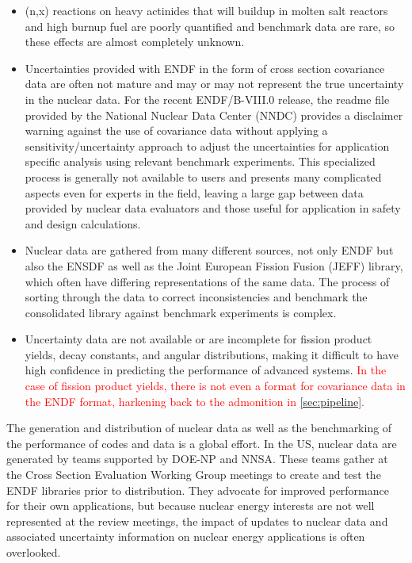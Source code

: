 \documentclass[letterpaper]{ar-1col}
\newcommand{\textred}[1]{\textcolor{red}{ #1}}
\begin{document}
\begin{itemize}
  \item (n,x) reactions on heavy actinides that will buildup in molten salt reactors and high burnup fuel are poorly quantified and benchmark data are rare, so these effects are almost completely unknown.
  \item Uncertainties provided with ENDF in the form of cross section covariance data are often not mature and may or may not represent the true uncertainty in the nuclear data.
For the recent ENDF/B-VIII.0 release, the readme file provided by the National Nuclear Data Center (NNDC) provides a disclaimer warning against the use of covariance data without applying a sensitivity/uncertainty approach to adjust the uncertainties for application specific analysis using relevant benchmark experiments.
This specialized process is generally not available to users and presents many complicated aspects even for experts in the field, leaving a large gap between data provided by nuclear data evaluators and those useful for application in safety and design calculations.
  \item Nuclear data are gathered from many different sources, not only ENDF but also the ENSDF as well as the Joint European Fission Fusion (JEFF) library, which often have differing representations of the same data.
The process of sorting through the data to correct inconsistencies and benchmark the consolidated library against benchmark experiments is complex.
  \item Uncertainty data are not available or are incomplete for fission product yields, decay constants, and angular distributions, making it difficult to have high confidence in predicting the performance of advanced systems.  \textred{In the case of fission product yields, there is not even a format for covariance data in the ENDF format, harkening back to the admonition in  \autoref{sec:pipeline}.}
\end{itemize}



The generation and distribution of nuclear data as well as the benchmarking of the performance of codes and data is a global effort.
In the US, nuclear data are generated by teams supported by DOE-NP and NNSA.
These teams gather at the Cross Section Evaluation Working Group meetings to create and test the ENDF libraries prior to distribution.
They advocate for improved performance for their own applications, but because nuclear energy interests are not well represented at the review meetings, the impact of updates to nuclear data and associated uncertainty information on nuclear energy applications is often overlooked.
\end{document}
